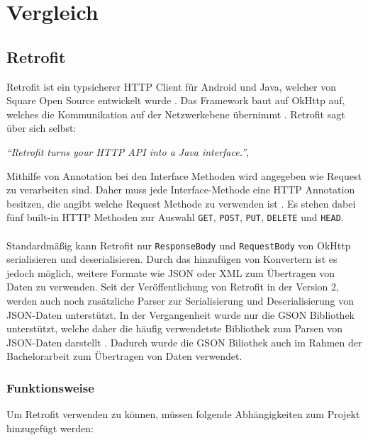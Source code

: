 \chapter{Vergleich}
\label{sec:comparison}

\section{Retrofit}
Retrofit ist ein typsicherer HTTP Client für Android und Java, welcher von Square Open Source entwickelt wurde \cite{retrofit}. Das Framework baut auf OkHttp auf, welches die Kommunikation auf der Netzwerkebene übernimmt \cite{okhttp}. Retrofit sagt über sich selbst:

\begin{center}
	\textit{\textquotedblleft Retrofit turns your HTTP API into a Java interface.\textquotedblright}, \cite[Webseite von Retrofit]{retrofit} 
	\\
\end{center}

Mithilfe von Annotation bei den Interface Methoden wird angegeben wie Request zu verarbeiten sind. Daher muss jede Interface-Methode eine HTTP Annotation besitzen, die angibt welche Request Methode zu verwenden ist \cite{retrofit}. Es stehen dabei fünf built-in HTTP Methoden zur Auswahl \texttt{GET}, \texttt{POST}, \texttt{PUT}, \texttt{DELETE} und \texttt{HEAD}.
\\\\
Standardmäßig kann Retrofit nur \texttt{ResponseBody} und \texttt{RequestBody} von OkHttp serialisieren und deserialisieren. Durch das hinzufügen von Konvertern ist es jedoch möglich, weitere Formate wie JSON oder XML zum Übertragen von Daten zu verwenden. Seit der Veröffentlichung von Retrofit in der Version 2, werden auch noch zusätzliche Parser zur Serialisierung und Deserialisierung von JSON-Daten unterstützt. In der Vergangenheit wurde nur die GSON Bibliothek unterstützt, welche daher die häufig verwendetste Bibliothek zum Parsen von JSON-Daten darstellt \cite{consumingRetrofit}. Dadurch wurde die GSON Biliothek auch im Rahmen der Bachelorarbeit zum Übertragen von Daten verwendet.

\subsection{Funktionsweise}
Um Retrofit verwenden zu können, müssen folgende Abhängigkeiten zum Projekt hinzugefügt werden:

